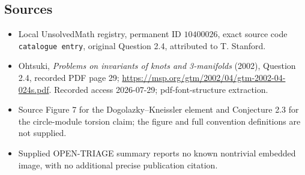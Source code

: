 \documentclass[11pt]{article}
\begin{document}
\subsection{Sources}
\begin{itemize}
\item Local UnsolvedMath registry, permanent ID \(10400026\), exact source code \texttt{catalogue entry}, original Question 2.4, attributed to T. Stanford.
\item Ohtsuki, \emph{Problems on invariants of knots and 3-manifolds} (2002), Question 2.4, recorded PDF page 29; \url{https://msp.org/gtm/2002/04/gtm-2002-04-024s.pdf}. Recorded access 2026-07-29; pdf-font-structure extraction.
\item Source Figure 7 for the Dogolazky--Kneissler element and Conjecture 2.3 for the circle-module torsion claim; the figure and full convention definitions are not supplied.
\item Supplied OPEN-TRIAGE summary reports no known nontrivial embedded image, with no additional precise publication citation.
\end{itemize}
\end{document}
